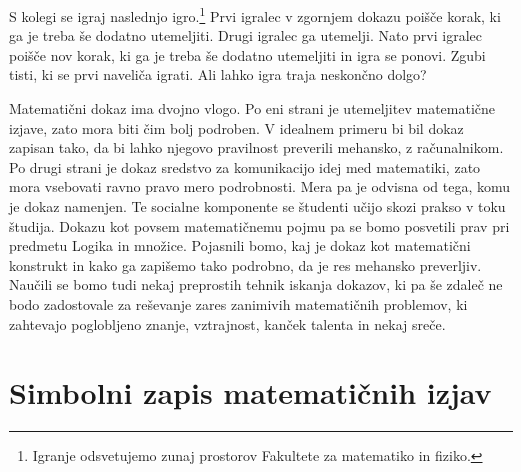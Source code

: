 \begin{vaja}
  S kolegi se igraj naslednjo igro.\footnote{%
    Igranje odsvetujemo zunaj prostorov Fakultete za matematiko in fiziko.}
  Prvi igralec v zgornjem dokazu poišče korak, ki ga je treba še dodatno
  utemeljiti. Drugi igralec ga utemelji. Nato prvi igralec poišče nov korak,
  ki ga je treba še dodatno utemeljiti in igra se ponovi. Zgubi tisti, ki se prvi naveliča igrati. Ali lahko igra traja neskončno dolgo?
\end{vaja}

Matematični dokaz ima dvojno vlogo. Po eni strani je utemeljitev matematične
izjave, zato mora biti čim bolj podroben. V idealnem primeru bi bil dokaz
zapisan tako, da bi lahko njegovo pravilnost preverili mehansko, z
računalnikom. Po drugi strani je dokaz sredstvo za komunikacijo idej med
matematiki, zato mora vsebovati ravno pravo mero podrobnosti. Mera pa je
odvisna od tega, komu je dokaz namenjen. Te socialne komponente se študenti
učijo skozi prakso v toku študija. Dokazu kot povsem matematičnemu pojmu pa se
bomo posvetili prav pri predmetu Logika in množice. Pojasnili bomo, kaj je
dokaz kot matematični konstrukt in kako ga zapišemo tako podrobno, da je res
mehansko preverljiv. Naučili se bomo tudi nekaj preprostih tehnik iskanja
dokazov, ki pa še zdaleč ne bodo zadostovale za reševanje zares zanimivih
matematičnih problemov, ki zahtevajo poglobljeno znanje, vztrajnost, kanček
talenta in nekaj sreče.



\section{Simbolni zapis matematičnih izjav}
\label{sec:simbolni-zapis-izjav}

